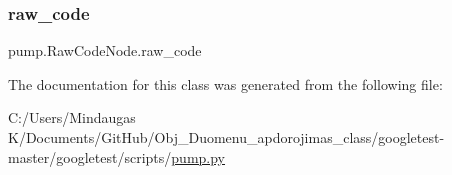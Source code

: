 \subsubsection{\texorpdfstring{raw\_code}{raw\_code}}
{\footnotesize\ttfamily pump.\+Raw\+Code\+Node.\+raw\+\_\+code}



The documentation for this class was generated from the following file\+:\begin{DoxyCompactItemize}
\item 
C\+:/\+Users/\+Mindaugas K/\+Documents/\+Git\+Hub/\+Obj\+\_\+\+Duomenu\+\_\+apdorojimas\+\_\+class/googletest-\/master/googletest/scripts/\mbox{\hyperlink{googletest-master_2googletest_2scripts_2pump_8py}{pump.\+py}}\end{DoxyCompactItemize}
